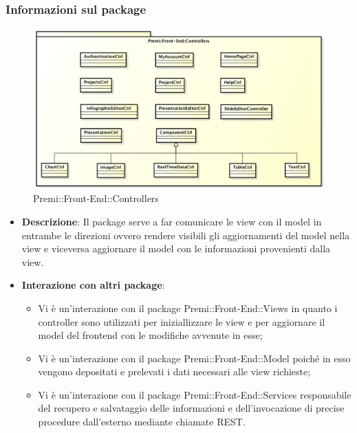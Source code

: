 \subsubsection*{Informazioni sul package}
\begin{figure}[h]
	\centering
	\includegraphics[width=1.0\linewidth]{img/front-end_controllers}
	\caption[Premi::Front-End::Controllers]{Premi::Front-End::Controllers}
\end{figure}
\begin{itemize}
	\item \textbf{Descrizione}: Il package serve a far comunicare le view con il model in entrambe le direzioni ovvero rendere visibili gli aggiornamenti del model nella view e viceversa aggiornare il model con le informazioni provenienti dalla view.
	\item \textbf{Interazione con altri package}:
	\begin{itemize}
		\item Vi è un'interazione con il package Premi::Front-End::Views in quanto i controller sono utilizzati per iniziallizzare le view e per aggiornare il model del frontend con le modifiche avvenute in esse;
		\item Vi è un'interazione con il package Premi::Front-End::Model poiché in esso vengono depositati e prelevati i dati necessari alle view richieste;
		\item Vi è un'interazione con il package Premi::Front-End::Services responsabile del recupero e salvataggio delle informazioni e dell'invocazione di precise procedure dall'esterno mediante chiamate REST.
	\end{itemize}

\end{itemize}

